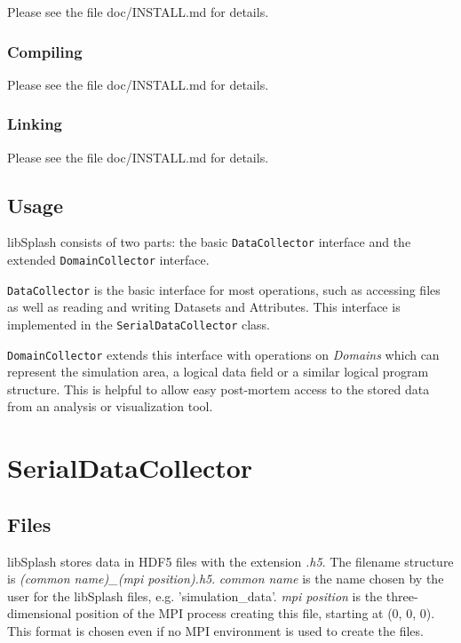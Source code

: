\documentclass[a4paper,10pt,BCOR12mm]{report}
\begin{document}
Please see the file doc/INSTALL.md for details.

\subsection{Compiling}

Please see the file doc/INSTALL.md for details.

\subsection{Linking}

Please see the file doc/INSTALL.md for details.

\section{Usage}

libSplash consists of two parts: the basic \texttt{DataCollector} interface and the extended \texttt{DomainCollector} interface.

\texttt{DataCollector} is the basic interface for most operations, such as accessing files as well as reading and writing Datasets and Attributes.
This interface is implemented in the \texttt{SerialDataCollector} class.

\texttt{DomainCollector} extends this interface with operations on \emph{Domains} which can represent the simulation area,
a logical data field or a similar logical program structure. This is helpful to allow easy post-mortem access to the stored data from
an analysis or visualization tool.


\chapter{SerialDataCollector}

\section{Files}

libSplash stores data in HDF5 files with the extension \emph{.h5}.
The filename structure is \emph{(common name)\_(mpi position).h5}.
\emph{common name} is the name chosen by the user for the libSplash files, e.g.
'simulation\_data'.
\emph{mpi position} is the three-dimensional position of the MPI process creating this
file, starting at (0, 0, 0).
This format is chosen even if no MPI environment is used to create the files.
\end{document}
